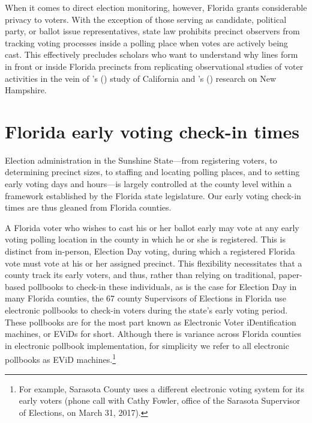 \documentclass[12pt,titlepage]{article}
\newcommand{\possessivecite}[1]{\citeauthor{#1}'s (\citeyear{#1})}
\begin{document}
When it comes to direct election monitoring, however, Florida grants
considerable privacy to voters.  With the exception of those serving
as candidate, political party, or ballot issue representatives, state
law prohibits precinct observers from tracking voting processes inside
a polling place when votes are actively being cast. This effectively
precludes scholars who want to understand why lines form in front or
inside Florida precincts from replicating observational studies of
voter activities in the vein of
\possessivecite{spencermarkovits:renege} study of California and
\possessivecite{herronsmith:hanoverstudy} research on New Hampshire.

\section*{Florida early voting check-in times}

Election administration in the Sunshine State---from registering
voters, to determining precinct sizes, to staffing and locating
polling places, and to setting early voting days and hours---is
largely controlled at the county level within a framework established
by the Florida state legislature. Our early voting check-in times are
thus gleaned from Florida counties.


A Florida voter who wishes to cast his or her ballot early may vote at
any early voting polling location in the county in which he or she is
registered.  This is distinct from in-person, Election Day voting,
during which a registered Florida vote must vote at his or her
assigned precinct.  This flexibility necessitates that a county track
its early voters, and thus, rather than relying on traditional,
paper-based pollbooks to check-in these individuals, as is the case
for Election Day in many Florida counties, the 67 county Supervisors
of Elections in Florida use electronic pollbooks to check-in voters
during the state's early voting period.  These pollbooks are for the
most part known as Electronic Voter iDentification machines, or EViDs
for short.  Although there is variance across Florida counties in
electronic pollbook implementation, for simplicity we refer to all
electronic pollbooks as EViD machines.\footnote{For example, Sarasota
  County uses a different electronic voting system for its early
  voters (phone call with Cathy Fowler, office of the Sarasota
  Supervisor of Elections, on March 31, 2017).}
\end{document}

